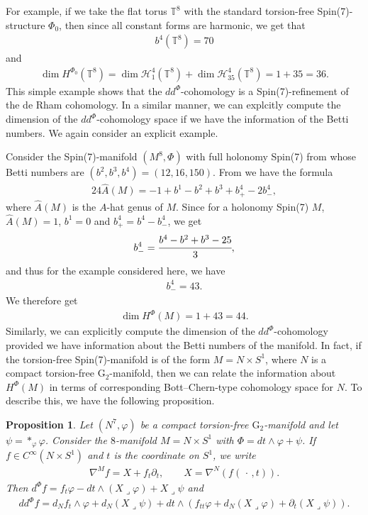 \documentclass[10pt,a4paper,reqno]{article}
\newtheorem{proposition}[theorem]{Proposition}
\theoremstyle{definition}
\numberwithin{equation}{section}
\def\G2{\mathrm{G}_2}
\def\g2{\varphi}
\def\ddphi{dd^{\Phi}}
\def\cH{\mathcal{H}}
\begin{document}
\medskip

For example, if we take the flat torus $\mathbb{T}^8$ with the standard torsion-free Spin(7)-structure $\Phi_0$, then since all constant forms are harmonic, we get that
\begin{align*}
b^4(\mathbb{T}^8) = 70
\end{align*}
and 
\begin{align*}
\dim H^{\Phi_0}(\mathbb{T}^8) = \dim \cH^4_1(\mathbb{T}^8)+\dim \cH^4_{35}(\mathbb{T}^8) = 1+35=36.
\end{align*}
This simple example shows that the $\ddphi$-cohomology is a Spin(7)-refinement of the de Rham cohomology. In a similar manner, we can explcitly compute the dimension of the $\ddphi$-cohomology space if we have the information of the Betti numbers. We again consider an explicit example. 

\medskip

Consider the Spin(7)-manifold $(M^8, \Phi)$ with full holonomy Spin(7) from \cite[Table 14.1, p.380]{joycebook} whose Betti numbers are $(b^2, b^3, b^4)=(12, 16, 150)$. From \cite[Thm. 10.6.1]{joycebook} we have the formula
\begin{align*}
24\hat{A}(M) = -1+b^1-b^2+b^3+b^4_{+}-2b^4_{-},
\end{align*}
where $\hat{A}(M)$ is the $A$-hat genus of $M$. Since for a holonomy Spin(7) $M$, $\hat{A}(M)=1$, $b^1=0$ and $b^4_+ = b^4-b^4_{-}$, we get
\begin{align*}
b^4_{-}=\cfrac{b^4-b^2+b^3-25}{3},    
\end{align*}
and thus for the example considered here, we have
\begin{align*}
b^4_{-} = 43.
\end{align*}
We therefore get 
\begin{align*}
\dim H^{\Phi}(M) = 1+43=44.
\end{align*}
Similarly, we can explicitly compute the dimension of the $\ddphi$-cohomology provided we have information about the Betti numbers of the manifold. In fact, if the torsion-free Spin(7)-manifold is of the form $M=N\times S^1$, where $N$ is a compact torsion-free $\G2$-manifold, then we can relate the information about $H^{\Phi}(M)$ in terms of corresponding Bott--Chern-type cohomology space for $N$. To describe this, we have the following proposition.

\begin{proposition}
Let $(N^7,\g2)$ be a compact torsion-free $\G2$-manifold and let $\psi=*_\varphi\varphi$. Consider the $8$-manifold $M=N\times S^1$ with $\Phi=dt\wedge\g2+\psi$. If $f\in C^\infty(N\times S^1)$ and $t$ is the coordinate on $S^1$, we write
\begin{align*}
\nabla^M f=X+f_t\partial_t,\qquad X=\nabla^N(f(\,\cdot\,,t)).
\end{align*}
Then
$d^\Phi f= f_t\varphi-dt\wedge(X\lrcorner\varphi)+X\lrcorner\psi$ and
\begin{align*}
\ddphi f= d_Nf_t\wedge\varphi+d_N(X\lrcorner\psi)+ dt\wedge \left(f_{tt}\varphi
+d_N(X\lrcorner\varphi) +\partial_t(X\lrcorner\psi)\right).
\end{align*}
\end{proposition} 
\end{document}
